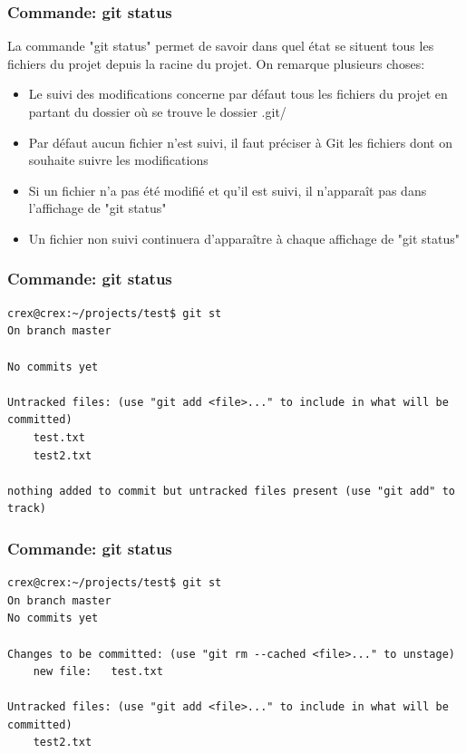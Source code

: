 \documentclass{beamer}
\begin{document}
\begin{frame}
\frametitle{Commande: git status}
La commande "git status" permet de savoir dans quel état se situent tous les fichiers du projet depuis la racine du projet. On remarque plusieurs choses:

\begin{itemize}
    \item Le suivi des modifications concerne par défaut tous les fichiers du projet en partant du dossier où se trouve le dossier .git/
    \item Par défaut aucun fichier n'est suivi, il faut préciser à Git les fichiers dont on souhaite suivre les modifications
    \item Si un fichier n'a pas été modifié et qu'il est suivi, il n'apparaît pas dans l'affichage de "git status"
    \item Un fichier non suivi continuera d'apparaître à chaque affichage de "git status"
\end{itemize}

\end{frame}

\begin{frame}[fragile]
\frametitle{Commande: git status}

    \begin{mdframed}[style=Bash]
    \begin{lstlisting}[style=Bash, caption={Tout premier appel à git status}]
crex@crex:~/projects/test$ git st
On branch master

No commits yet

Untracked files: (use "git add <file>..." to include in what will be committed)
	test.txt
	test2.txt

nothing added to commit but untracked files present (use "git add" to track)
    \end{lstlisting}
    \end{mdframed}

\end{frame}


\begin{frame}[fragile]
\frametitle{Commande: git status}

    \begin{mdframed}[style=Bash]
    \begin{lstlisting}[style=Bash, caption={git status après ajout au suivi de test.txt}]
crex@crex:~/projects/test$ git st
On branch master
No commits yet

Changes to be committed: (use "git rm --cached <file>..." to unstage)
	new file:   test.txt

Untracked files: (use "git add <file>..." to include in what will be committed)
	test2.txt
    \end{lstlisting}
    \end{mdframed}

\end{frame}
\end{document}

